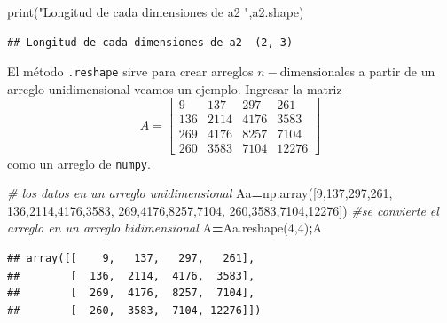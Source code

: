 \documentclass[
]{book}
\newenvironment{Shaded}{\begin{snugshade}}{\end{snugshade}}
\newcommand{\BuiltInTok}[1]{#1}
\newcommand{\CommentTok}[1]{\textcolor[rgb]{0.56,0.35,0.01}{\textit{#1}}}
\newcommand{\DecValTok}[1]{\textcolor[rgb]{0.00,0.00,0.81}{#1}}
\newcommand{\NormalTok}[1]{#1}
\newcommand{\OperatorTok}[1]{\textcolor[rgb]{0.81,0.36,0.00}{\textbf{#1}}}
\newcommand{\StringTok}[1]{\textcolor[rgb]{0.31,0.60,0.02}{#1}}
\theoremstyle{definition}
\theoremstyle{definition}
\theoremstyle{definition}
\theoremstyle{definition}
\theoremstyle{remark}
\begin{document}
\begin{Shaded}
\begin{Highlighting}[]
\BuiltInTok{print}\NormalTok{(}\StringTok{"Longitud de cada dimensiones de a2 "}\NormalTok{,a2.shape)}
\end{Highlighting}
\end{Shaded}

\begin{verbatim}
## Longitud de cada dimensiones de a2  (2, 3)
\end{verbatim}

El método \texttt{.reshape} sirve para crear arreglos \(n-\)dimensionales a partir de un arreglo unidimensional veamos un ejemplo. Ingresar la matriz \begin{equation}
A=\begin{bmatrix}
  9 & 137 &297 &261 \\
  136 & 2114 &4176 &3583 \\
  269 &4176 &8257 &7104 \\
  260 & 3583 &7104 &12276
\end{bmatrix} 
\label{eq:matrizxtxe}
\end{equation} como un arreglo de \texttt{numpy}.

\begin{Shaded}
\begin{Highlighting}[]
\CommentTok{\# los datos en un arreglo unidimensional }
\NormalTok{Aa}\OperatorTok{=}\NormalTok{np.array([}\DecValTok{9}\NormalTok{,}\DecValTok{137}\NormalTok{,}\DecValTok{297}\NormalTok{,}\DecValTok{261}\NormalTok{, }
            \DecValTok{136}\NormalTok{,}\DecValTok{2114}\NormalTok{,}\DecValTok{4176}\NormalTok{,}\DecValTok{3583}\NormalTok{,}
            \DecValTok{269}\NormalTok{,}\DecValTok{4176}\NormalTok{,}\DecValTok{8257}\NormalTok{,}\DecValTok{7104}\NormalTok{, }
            \DecValTok{260}\NormalTok{,}\DecValTok{3583}\NormalTok{,}\DecValTok{7104}\NormalTok{,}\DecValTok{12276}\NormalTok{])}
\CommentTok{\#se convierte el arreglo en un arreglo bidimensional}
\NormalTok{A}\OperatorTok{=}\NormalTok{Aa.reshape(}\DecValTok{4}\NormalTok{,}\DecValTok{4}\NormalTok{)}\OperatorTok{;}\NormalTok{A}
\end{Highlighting}
\end{Shaded}

\begin{verbatim}
## array([[    9,   137,   297,   261],
##        [  136,  2114,  4176,  3583],
##        [  269,  4176,  8257,  7104],
##        [  260,  3583,  7104, 12276]])
\end{verbatim}
\end{document}
